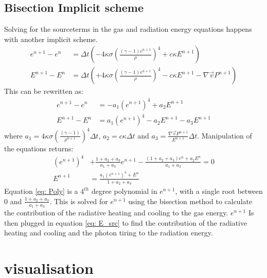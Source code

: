 \subsection{Bisection Implicit scheme} \label{subsection: BIS}
Solving for the sourceterms in the gas and radiation energy equations happens with another implicit scheme. 
\begin{align}
e^{n+1} - e^n &= \Delta t \left( -4\kappa \sigma \left(\frac{(\gamma - 1)e^{n+1}}{\rho}\right)^4 + c \kappa E^{n+1} \right) \\ 
E^{n+1} - E^n &= \Delta t \left( +4\kappa \sigma \left(\frac{(\gamma - 1)e^{n+1}}{\rho}\right)^4 - c \kappa E^{n+1} -\nabla \vec{v} P^{n+1} \right)
\end{align} 
This can be rewritten as:
\begin{align}
e^{n+1} - e^n &= -a_1 \left( e^{n+1}\right)^4 + a_2 E^{n+1}  \\ 
E^{n+1} - E^n &= a_1 \left( e^{n+1} \right)^4 - a_2 E^{n+1} - a_3 E^{n+1} 
\end{align}
where $a_1 = 4\kappa \sigma \left(\frac{(\gamma - 1)}{\rho^{n+1}}\right)^4 \Delta t$, $a_2 = c \kappa \Delta t$ and $a_3 = \frac{\nabla \vec{v} P^{n+1} }{E^{n+1}} \Delta t$. Manipulation of the equations returns:
\begin{align}
\left( e^{n+1} \right)^4 &+ \frac{1 + a_2 + a_3}{a_1 + a_3}e^{n+1} -  \frac{(1 + a_2 + a_3)e^n + a_2 E^n}{a_1 + a_3} = 0 \\ \label{eq: Poly}
E^{n+1} &= \frac{a_1 \left( e^{n+1} \right)^4 + E^n}{1 + a_2 + a_3} %
\end{align}
Equation \eqref{eq: Poly} is a $4^{th}$ degree polynomial in $e^{n+1}$, with a single root between $0$ and $\frac{1 + a_2 + a_3}{a_1 + a_3}$. This is solved for $e^{n+1}$ using the bisection method to calculate the contribution of the radiative heating and cooling to the gas energy. $e^{n+1}$ Is then plugged in equation \eqref{eq: E_src} to find the contribution of the radiative heating and cooling and the photon tiring to the radiation energy.
\section{visualisation}
